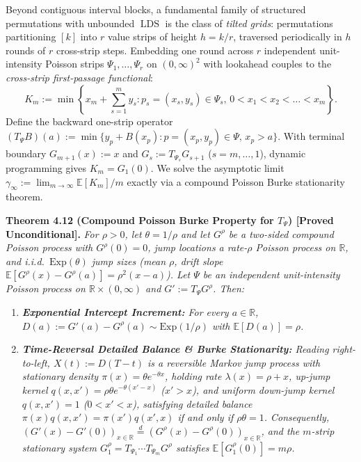 \documentclass[
  11pt,
]{article}
\providecommand{\tightlist}{%
  \setlength{\itemsep}{0pt}\setlength{\parskip}{0pt}}
\begin{document}
Beyond contiguous interval blocks, a fundamental family of structured permutations with unbounded \(\operatorname{LDS}\) is the class of \emph{tilted grids}: permutations partitioning \([k]\) into \(r\) value strips of height \(h = k/r\), traversed periodically in \(h\) rounds of \(r\) cross-strip steps. Embedding one round across \(r\) independent unit-intensity Poisson strips \(\Psi_1, \dots, \Psi_r\) on \((0, \infty)^2\) with lookahead couples to the \emph{cross-strip first-passage functional}:
\begin{equation}
K_m := \min \left\{ x_m + \sum_{s=1}^m y_s : p_s = (x_s, y_s) \in \Psi_s, \, 0 < x_1 < x_2 < \dots < x_m \right\}.
\end{equation}
Define the backward one-strip operator \((T_\Psi B)(a) := \min \{ y_p + B(x_p) : p = (x_p, y_p) \in \Psi, \, x_p > a \}\). With terminal boundary \(G_{m+1}(x) := x\) and \(G_s := T_{\Psi_s} G_{s+1}\) (\(s = m, \dots, 1\)), dynamic programming gives \(K_m = G_1(0)\). We solve the asymptotic limit \(\gamma_\infty := \lim_{m \to \infty} \mathbb{E}[K_m]/m\) exactly via a compound Poisson Burke stationarity theorem.

\textbf{Theorem 4.12 (Compound Poisson Burke Property for \(T_\Psi\)) [Proved Unconditional].}
\emph{For \(\rho > 0\), let \(\theta = 1/\rho\) and let \(G^\rho\) be a two-sided compound Poisson process with \(G^\rho(0) = 0\), jump locations a rate-\(\rho\) Poisson process on \(\mathbb{R}\), and i.i.d.\ \(\mathrm{Exp}(\theta)\) jump sizes (mean \(\rho\), drift slope \(\mathbb{E}[G^\rho(x) - G^\rho(a)] = \rho^2(x - a)\)). Let \(\Psi\) be an independent unit-intensity Poisson process on \(\mathbb{R} \times (0, \infty)\) and \(G' := T_\Psi G^\rho\). Then:}
\begin{enumerate}
\def\labelenumi{\arabic{enumi}.}
\tightlist
\item \emph{\textbf{Exponential Intercept Increment:} For every \(a \in \mathbb{R}\), \(D(a) := G'(a) - G^\rho(a) \sim \mathrm{Exp}(1/\rho)\) with \(\mathbb{E}[D(a)] = \rho\).}
\item \emph{\textbf{Time-Reversal Detailed Balance \& Burke Stationarity:} Reading right-to-left, \(X(t) := D(T - t)\) is a reversible Markov jump process with stationary density \(\pi(x) = \theta e^{-\theta x}\), holding rate \(\lambda(x) = \rho + x\), up-jump kernel \(q(x, x') = \rho\theta e^{-\theta(x'-x)}\) (\(x' > x\)), and uniform down-jump kernel \(q(x, x') = 1\) (\(0 < x' < x\)), satisfying detailed balance \(\pi(x)q(x, x') = \pi(x')q(x', x)\) if and only if \(\rho\theta = 1\). Consequently, \((G'(x) - G'(0))_{x \in \mathbb{R}} \stackrel{d}{=} (G^\rho(x) - G^\rho(0))_{x \in \mathbb{R}}\), and the \(m\)-strip stationary system \(G^\rho_1 = T_{\Psi_1} \cdots T_{\Psi_m} G^\rho\) satisfies \(\mathbb{E}[G^\rho_1(0)] = m \rho\).}
\end{enumerate}
\end{document}

